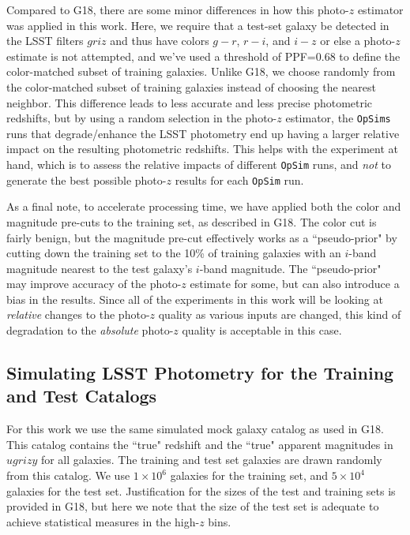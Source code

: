 Compared to G18, there are some minor differences in how this photo-$z$ estimator was applied in this work. Here, we require that a test-set galaxy be detected in the LSST filters $griz$ and thus have colors $g-r$, $r-i$, and $i-z$ or else a photo-$z$ estimate is not attempted, and we've used a threshold of PPF=$0.68$ to define the color-matched subset of training galaxies. Unlike G18, we choose randomly from the color-matched subset of training galaxies instead of choosing the nearest neighbor. This difference leads to less accurate and less precise photometric redshifts, but by using a random selection in the photo-$z$ estimator, the {\tt OpSims} runs that degrade/enhance the LSST photometry end up having a larger relative impact on the resulting photometric redshifts. This helps with the experiment at hand, which is to assess the relative impacts of different {\tt OpSim} runs, and {\em not} to generate the best possible photo-$z$ results for each {\tt OpSim} run.

As a final note, to accelerate processing time, we have applied both the color and magnitude pre-cuts to the training set, as described in G18. The color cut is fairly benign, but the magnitude pre-cut effectively works as a ``pseudo-prior" by cutting down the training set to the 10\% of training galaxies with an $i$-band magnitude nearest to the test galaxy's $i$-band magnitude. The ``pseudo-prior" may improve accuracy of the photo-$z$ estimate for some, but can also introduce a bias in the results. Since all of the experiments in this work will be looking at {\it relative} changes to the photo-$z$ quality as various inputs are changed, this kind of degradation to the {\it absolute} photo-$z$ quality is acceptable in this case.


\subsection{Simulating LSST Photometry for the Training and Test Catalogs} \label{ssec:pz_exp_cats}

For this work we use the same simulated mock galaxy catalog as used in G18. This catalog contains the ``true" redshift and the ``true" apparent magnitudes in $ugrizy$ for all galaxies. The training and test set galaxies are drawn randomly from this catalog. We use $1\times10^6$ galaxies for the training set, and $5\times10^4$ galaxies for the test set. Justification for the sizes of the test and training sets is provided in G18, but here we note that the size of the test set is adequate to achieve statistical measures in the high-$z$ bins.


